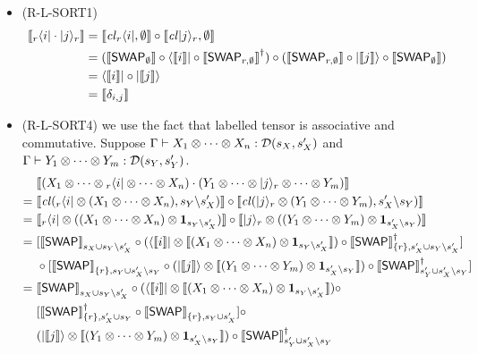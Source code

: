 \documentclass[runningheads]{llncs}
\def\>{\ensuremath{\rangle}}
\def\<{\ensuremath{\langle}}
\newcommand {\Swap } {{\mathsf{SWAP}}}
\begin{document}
\begin{itemize}
  \item (R-L-SORT1) 
  \begin{align*}
    \sem{{}_r\<i|\cdot|j\>_r} &= \sem{\cl{{}_r\<i|,\emptyset}} \circ \sem{\cl{|j\>_r,\emptyset}} \\
    &= (\sem{\Swap_{\emptyset}} \circ \<\sem{i}| \circ \sem{\Swap_{r,\emptyset}}^\dagger) \circ (\sem{\Swap_{r,\emptyset}} \circ |\sem{j}\>\circ \sem{\Swap_{\emptyset}}) \\
    &= \<\sem{i}|\circ |\sem{j}\> \\
    &= \sem{\delta_{i,j}}
  \end{align*}

  \item (R-L-SORT4) we use the fact that labelled tensor is associative and commutative. Suppose $\Gamma \vdash X_1\otimes \cdots \otimes X_n : {\mathcal{D}}(s_X, s_X')$ and $\Gamma \vdash Y_1\otimes \cdots \otimes Y_m : {\mathcal{D}}(s_Y, s_Y')$.
  \begin{align*}
    &\sem{(X_1\otimes\cdots\otimes {}_r\<i|\otimes\cdots\otimes X_n)\cdot (Y_1\otimes\cdots\otimes |j\>_r \otimes\cdots\otimes Y_m)} \\
    =\ & \sem{\cl({}_r\<i| \otimes (X_1\otimes\cdots\otimes X_n), s_Y\backslash s_X')}\circ 
    \sem{\cl(|j\>_r \otimes (Y_1\otimes\cdots\otimes Y_m), s_X'\backslash s_Y)} \\
    =\ & \sem{{}_r\<i| \otimes ((X_1\otimes\cdots\otimes X_n) \otimes \mathbf{1}_{s_Y\backslash s_X'})}\circ 
    \sem{|j\>_r \otimes ((Y_1\otimes\cdots\otimes Y_m) \otimes \mathbf{1}_{s_X'\backslash s_Y})} \\
    =\ & [\sem{\Swap}_{s_X \cup s_Y\backslash s_X'}\circ(\<\sem{i}| \otimes \sem{(X_1\otimes\cdots\otimes X_n) \otimes \mathbf{1}_{s_Y\backslash s_X'}})\circ \sem{\Swap}_{\{r\}, s_X' \cup s_Y\backslash s_X'}^\dagger] \\
    & \circ [\sem{\Swap}_{\{r\}, s_Y \cup s_X'\backslash s_Y}\circ(|\sem{j}\> \otimes \sem{(Y_1\otimes\cdots\otimes Y_m) \otimes \mathbf{1}_{s_X'\backslash s_Y}})\circ \sem{\Swap}_{s_Y' \cup s_X'\backslash s_Y}^\dagger]\\
    =\ & \sem{\Swap}_{s_X\cup s_Y\backslash s_X'}\circ(\<\sem{i}| \otimes \sem{(X_1\otimes\cdots\otimes X_n) \otimes \mathbf{1}_{s_Y\backslash s_X'}})\circ \\
    &[\sem{\Swap}_{\{r\}, s_X'\cup s_Y}^\dagger
     \circ \sem{\Swap}_{\{r\}, s_Y \cup s_X'}] \circ \\
    &(|\sem{j}\> \otimes \sem{(Y_1\otimes\cdots\otimes Y_m) \otimes \mathbf{1}_{s_X'\backslash s_Y}})\circ \sem{\Swap}_{s_Y'\cup s_X'\backslash s_Y}^\dagger\\

\end{align*}
\end{itemize}
\end{document}

